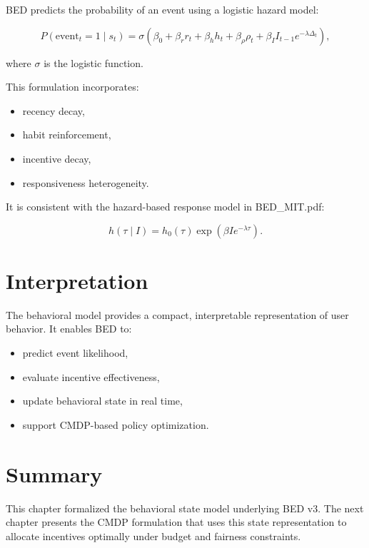 BED predicts the probability of an event using a logistic hazard model:


\[
P(\text{event}_t = 1 \mid s_t) =
\sigma\left(
\beta_0
+ \beta_r r_t
+ \beta_h h_t
+ \beta_\rho \rho_t
+ \beta_I I_{t-1} e^{-\lambda \Delta_t}
\right),
\]


where $\sigma$ is the logistic function.

This formulation incorporates:
\begin{itemize}
    \item recency decay,
    \item habit reinforcement,
    \item incentive decay,
    \item responsiveness heterogeneity.
\end{itemize}

It is consistent with the hazard-based response model in BED\_MIT.pdf:


\[
h(\tau \mid I) = h_0(\tau)\exp(\beta I e^{-\lambda \tau}).
\]



\section{Interpretation}

The behavioral model provides a compact, interpretable representation of user
behavior. It enables BED to:
\begin{itemize}
    \item predict event likelihood,
    \item evaluate incentive effectiveness,
    \item update behavioral state in real time,
    \item support CMDP-based policy optimization.
\end{itemize}

\section{Summary}

This chapter formalized the behavioral state model underlying BED v3. The next
chapter presents the CMDP formulation that uses this state representation to
allocate incentives optimally under budget and fairness constraints.

